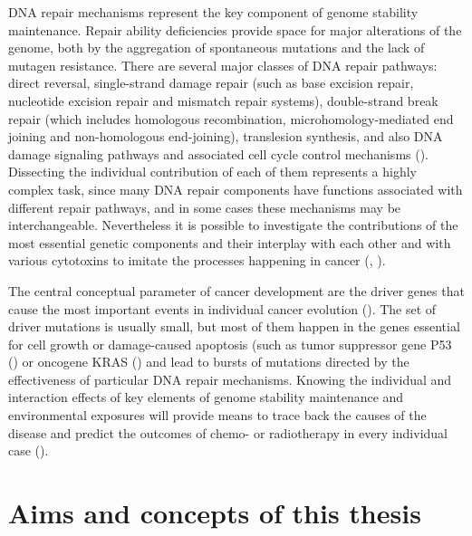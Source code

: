DNA repair mechanisms represent the key component of genome stability maintenance. 
Repair ability deficiencies provide space for major alterations of the genome, both 
by the aggregation of spontaneous mutations and the lack of mutagen resistance. 
There are several major classes of DNA repair pathways: direct reversal, single-strand 
damage repair (such as base excision repair, nucleotide excision repair and mismatch 
repair systems), double-strand break repair (which includes homologous recombination, 
microhomology-mediated end joining and non-homologous end-joining), translesion synthesis, 
and also DNA damage signaling pathways and associated cell cycle control mechanisms 
(\cite{Alberts2007-qn}). Dissecting the individual contribution of each of them represents 
a highly complex task, since many DNA repair components have functions associated with 
different repair pathways, and in some cases these mechanisms may be interchangeable. 
Nevertheless it is possible to investigate the contributions of the most essential 
genetic components and their interplay with each other and with various cytotoxins 
to imitate the processes happening in cancer (\cite{Helleday2014-kw}, \cite{Wu2016-qp}).

The central conceptual parameter of cancer development are the driver genes that 
cause the most important events in individual cancer evolution (\cite{Stratton2009-kh}). 
The set of driver mutations is usually small, but most of them happen in the genes 
essential for cell growth or damage-caused apoptosis (such as tumor suppressor gene 
P53 (\cite{Rivlin2011-cz}) or oncogene KRAS (\cite{Wang2015-ki}) and lead to bursts of mutations directed 
by the effectiveness of particular DNA repair mechanisms. Knowing the individual and 
interaction effects of key elements of genome stability maintenance and environmental 
exposures will provide means to trace back the causes of the disease and predict the 
outcomes of chemo- or radiotherapy in every individual case (\cite{Poon2014-review}).








\section{Aims and concepts of this thesis}

